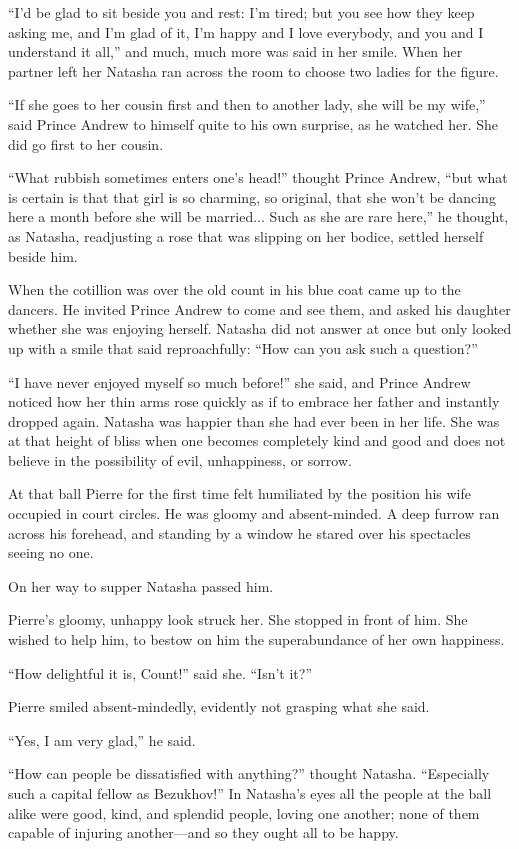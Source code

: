 ``I'd be glad to sit beside you and rest: I'm tired; but you see
how they keep asking me, and I'm glad of it, I'm happy and I love
everybody, and you and I understand it all,'' and much, much more
was said in her smile.  When her partner left her Natasha ran
across the room to choose two ladies for the figure.

``If she goes to her cousin first and then to another lady, she
will be my wife,'' said Prince Andrew to himself quite to his own
surprise, as he watched her. She did go first to her cousin.

``What rubbish sometimes enters one's head!'' thought Prince
Andrew, ``but what is certain is that that girl is so charming,
so original, that she won't be dancing here a month before she
will be married... Such as she are rare here,'' he thought, as
Natasha, readjusting a rose that was slipping on her bodice,
settled herself beside him.

When the cotillion was over the old count in his blue coat came
up to the dancers. He invited Prince Andrew to come and see them,
and asked his daughter whether she was enjoying herself. Natasha
did not answer at once but only looked up with a smile that said
reproachfully: ``How can you ask such a question?''

``I have never enjoyed myself so much before!'' she said, and
Prince Andrew noticed how her thin arms rose quickly as if to
embrace her father and instantly dropped again. Natasha was
happier than she had ever been in her life. She was at that
height of bliss when one becomes completely kind and good and
does not believe in the possibility of evil, unhappiness, or
sorrow.

At that ball Pierre for the first time felt humiliated by the
position his wife occupied in court circles. He was gloomy and
absent-minded. A deep furrow ran across his forehead, and
standing by a window he stared over his spectacles seeing no one.

On her way to supper Natasha passed him.

Pierre's gloomy, unhappy look struck her. She stopped in front of
him.  She wished to help him, to bestow on him the superabundance
of her own happiness.

``How delightful it is, Count!'' said she. ``Isn't it?''

Pierre smiled absent-mindedly, evidently not grasping what she
said.

``Yes, I am very glad,'' he said.

``How can people be dissatisfied with anything?'' thought
Natasha.  ``Especially such a capital fellow as Bezukhov!'' In
Natasha's eyes all the people at the ball alike were good, kind,
and splendid people, loving one another; none of them capable of
injuring another---and so they ought all to be happy.

